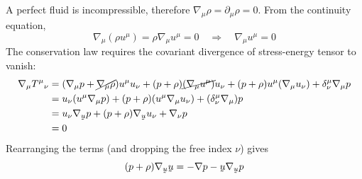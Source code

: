 \documentclass{article}
\newcommand{\ut}[1]{\underaccent{\tilde}{#1}}
\begin{document}
\section{}
A perfect fluid is incompressible, therefore $\nabla_\mu \rho = \partial_\mu \rho = 0$. From the continuity equation,
\[ \nabla_\mu(\rho u^\mu) =  \rho \nabla_\mu u^\mu = 0 \quad\Rightarrow\quad \nabla_\mu u^\mu = 0\]
The conservation law requires the covariant divergence of stress-energy tensor to vanish:
\begin{align*}
\nabla_\mu T^\mu{}_\nu &= (\nabla_\mu p + \cancel{\nabla_\mu\rho}) u^\mu u_\nu + (p+\rho) \cancel{(\nabla_\mu u^\mu)} u_\nu + (p+\rho) u^\mu (\nabla_\mu u_\nu) + \delta^\mu_\nu \nabla_\mu p \\
&= u_\nu (u^\mu \nabla_\mu p)  + (p+\rho) (u^\mu \nabla_\mu u_\nu) + (\delta^\mu_\nu \nabla_\mu) p \\
&=  u_\nu \nabla_{\ut{u}} p  + (p+\rho) \nabla_{\ut{u}} u_\nu + \nabla_\nu p  \\
&= 0
\end{align*}
Rearranging the terms (and dropping the free index $\nu$) gives
\[ (p + \rho)\nabla_{\ut{u}}\ut{u} = - \nabla p - \ut{u}\nabla_{\ut{u}}p \]
\end{document}
